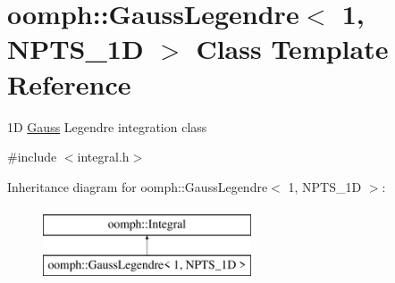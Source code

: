 \hypertarget{classoomph_1_1GaussLegendre_3_011_00_01NPTS__1D_01_4}{}\section{oomph\+:\+:Gauss\+Legendre$<$ 1, N\+P\+T\+S\+\_\+1D $>$ Class Template Reference}
\label{classoomph_1_1GaussLegendre_3_011_00_01NPTS__1D_01_4}


1D \hyperlink{classoomph_1_1Gauss}{Gauss} Legendre integration class  




{\ttfamily \#include $<$integral.\+h$>$}

Inheritance diagram for oomph\+:\+:Gauss\+Legendre$<$ 1, N\+P\+T\+S\+\_\+1D $>$\+:\begin{figure}[H]
\begin{center}
\leavevmode
\includegraphics[height=2.000000cm]{classoomph_1_1GaussLegendre_3_011_00_01NPTS__1D_01_4}
\end{center}
\end{figure}
